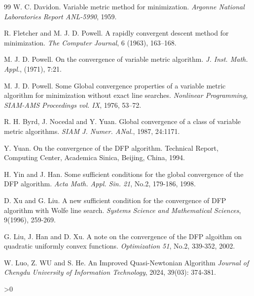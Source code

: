 \documentclass[12pt,a4paper,draft]{article}  %
\newcommand{\bibfile}{\jobname.bib}  %
\newcounter{cite}
\theoremstyle{definition}
\numberwithin{equation}{section}
\begin{document}
\begin{thebibliography}{99}
    W. C. Davidon. 
    Variable metric method for minimization.
    \textit{Argonne National Laboratories Report ANL-5990}, 1959.

    R. Fletcher and M. J. D. Powell.
    A rapidly convergent descent method for minimization.
    \textit{The Computer Journal}, 6 (1963), 163–168.

    M. J. D. Powell.
    On the convergence of variable metric algorithm.
    \textit{J. Inst. Math. Appl.}, (1971), 7:21.

    M. J. D. Powell.
    Some Global convergence properties of a variable metric algorithm for minimization without exact line searches.
    \textit{Nonlinear Programming, SIAM-AMS Proceedings vol. IX}, 1976, 53–72.

    R. H. Byrd, J. Nocedal and Y. Yuan.
    Global convergence of a class of variable metric algorithms.
    \textit{SIAM J. Numer. ANal.}, 1987, 24:1171.

    Y. Yuan.
    On the convergence of the DFP algorithm.
    Technical Report, Computing Center, Academica Sinica, Beijing, China, 1994.

    H. Yin and J. Han.
    Some sufficient conditions for the global convergence of the DFP algorithm.
   \textit{Acta Math. Appl. Sin. 21}, No.2, 179-186, 1998.

    D. Xu and G. Liu.
    A new sufficient condition for the convergence of DFP algorithm with Wolfe line search.
    \textit{Systems Science and Mathematical Sciences}, 9(1996), 259-269.

    G. Liu, J. Han and D. Xu.
    A note on the convergence of the DFP algoithm on quadratic uniformly convex functions.
    \textit{Optimization 51}, No.2, 339-352, 2002.

    W. Luo, Z. WU and S. He.
    An Improved Quasi-Newtonian Algorithm
    \textit{Journal of Chengdu University of Information Technology}, 2024, 39(03): 374-381.



\end{thebibliography}

\ifnum\value{cite}>0
    \small
    
    
\fi

\end{document}
